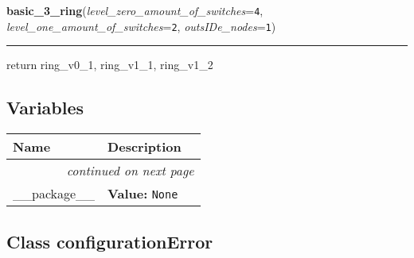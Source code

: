 \hspace{.8\funcindent}\begin{boxedminipage}{\funcwidth}

    \raggedright \textbf{basic\_3\_ring}(\textit{level\_zero\_amount\_of\_switches}={\tt 4}, \textit{level\_one\_amount\_of\_switches}={\tt 2}, \textit{outsIDe\_nodes}={\tt 1})

    \vspace{-1.5ex}

    \rule{\textwidth}{0.5\fboxrule}
\setlength{\parskip}{2ex}
    return ring\_v0\_1, ring\_v1\_1, ring\_v1\_2

\setlength{\parskip}{1ex}
    \end{boxedminipage}



  \subsection{Variables}

    \vspace{-1cm}
\hspace{\varindent}\begin{longtable}{|p{\varnamewidth}|p{\vardescrwidth}|l}
\cline{1-2}
\cline{1-2} \centering \textbf{Name} & \centering \textbf{Description}& \\
\cline{1-2}
\endhead\cline{1-2}\multicolumn{3}{r}{\small\textit{continued on next page}}\\\endfoot\cline{1-2}
\endlastfoot\raggedright \_\-\_\-p\-a\-c\-k\-a\-g\-e\-\_\-\_\- & \raggedright \textbf{Value:} 
{\tt None}&\\
\cline{1-2}
\end{longtable}



\subsection{Class configurationError}

